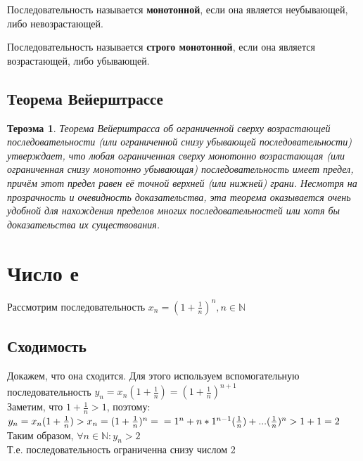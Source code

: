 \documentclass[oneside]{book}
\newtheorem{thm}{Тероэма}[chapter] %
\begin{document}
Последовательность называется \textbf{монотонной}, если она является неубывающей, либо невозрастающей.

Последовательность называется \textbf{строго монотонной}, если она является возрастающей, либо убывающей. 
\section{Теорема Вейерштрассе}
\begin{thm}Теорема Вейерштрасса об ограниченной сверху возрастающей последовательности (или ограниченной снизу убывающей последовательности) утверждает, что любая ограниченная сверху монотонно возрастающая (или ограниченная снизу монотонно убывающая) последовательность имеет предел, причём этот предел равен её точной верхней (или нижней) грани. Несмотря на прозрачность и очевидность доказательства, эта теорема оказывается очень удобной для нахождения пределов многих последовательностей или хотя бы доказательства их существования. \end{thm}

\setcounter{chapter}{7}
\chapter{Число е}
Рассмотрим последовательность $x_n=(1+\frac{1}{n})^n, n \in \mathbb{N}$\\
\section{Сходимость}
Докажем, что она сходится. Для этого используем вспомогательную последовательность
$y_n=x_n(1+\frac{1}{n})=(1+\frac{1}{n})^{n+1}$\\
Заметим, что $1+\frac{1}{n}>1$, поэтому:\\ $y_n=x_n(1+\frac{1}{n})>x_n=(1+\frac{1}{n})^n=\\=1^n+n*1^{n-1}(\frac{1}{n})+...(\frac{1}{n})^n>1+1=2$
\\Таким образом, $\forall n \in \mathbb{N} :y_n>2$
\\Т.е. последовательность ограниченна снизу числом 2
\end{document}
